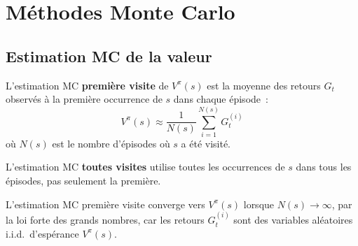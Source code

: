 \section{M\'ethodes Monte Carlo}

\subsection{Estimation MC de la valeur}

\begin{definition}
L'estimation MC \textbf{premi\`ere visite} de $V^\pi(s)$ est la moyenne des
retours $G_t$ observ\'es \`a la premi\`ere occurrence de $s$ dans chaque \'episode~:
\[
    V^\pi(s) \approx \frac{1}{N(s)} \sum_{i=1}^{N(s)} G_t^{(i)}
\]
o\`u $N(s)$ est le nombre d'\'episodes o\`u $s$ a \'et\'e visit\'e.
\end{definition}

\begin{definition}
L'estimation MC \textbf{toutes visites} utilise toutes les occurrences de $s$
dans tous les \'episodes, pas seulement la premi\`ere.
\end{definition}

\begin{theoreme}
L'estimation MC premi\`ere visite converge vers $V^\pi(s)$ lorsque $N(s) \to \infty$,
par la loi forte des grands nombres, car les retours $G_t^{(i)}$ sont des variables
al\'eatoires i.i.d.\ d'esp\'erance $V^\pi(s)$.
\end{theoreme}

